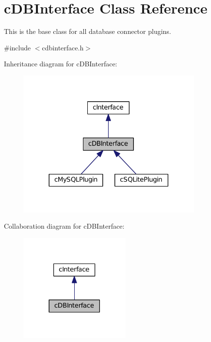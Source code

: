 \hypertarget{classc_d_b_interface}{}\section{c\+D\+B\+Interface Class Reference}
\label{classc_d_b_interface}


This is the base class for all database connector plugins.  




{\ttfamily \#include $<$cdbinterface.\+h$>$}



Inheritance diagram for c\+D\+B\+Interface\+:
\nopagebreak
\begin{figure}[H]
\begin{center}
\leavevmode
\includegraphics[width=264pt]{classc_d_b_interface__inherit__graph}
\end{center}
\end{figure}


Collaboration diagram for c\+D\+B\+Interface\+:
\nopagebreak
\begin{figure}[H]
\begin{center}
\leavevmode
\includegraphics[width=158pt]{classc_d_b_interface__coll__graph}
\end{center}
\end{figure}
